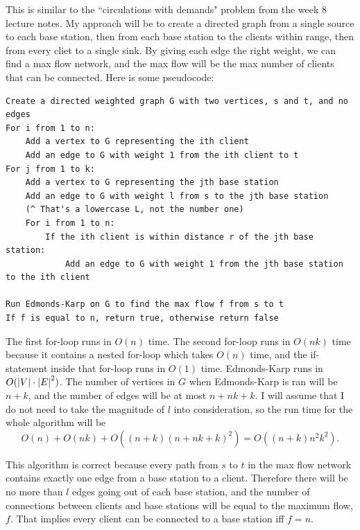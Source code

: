 \documentclass{article}
\begin{document}
\bigskip
\par
\begin{prob}
\end{prob}
This is similar to the ``circulations with demands" problem from the week 8 lecture notes. My approach will be to create a directed graph from a single source to each base station, then from each base station to the clients within range, then from every cliet to a single sink. By giving each edge the right weight, we can find a max flow network, and the max flow will be the max number of clients that can be connected. Here is some pseudocode:
\begin{lstlisting}[frame=single]
Create a directed weighted graph G with two vertices, s and t, and no edges
For i from 1 to n:
    Add a vertex to G representing the ith client
    Add an edge to G with weight 1 from the ith client to t
For j from 1 to k:
    Add a vertex to G representing the jth base station
    Add an edge to G with weight l from s to the jth base station
    (^ That's a lowercase L, not the number one)
    For i from 1 to n:
        If the ith client is within distance r of the jth base station:
            Add an edge to G with weight 1 from the jth base station to the ith client

Run Edmonds-Karp on G to find the max flow f from s to t
If f is equal to n, return true, otherwise return false
\end{lstlisting}
The first for-loop runs in $O(n)$ time. The second for-loop runs in $O(nk)$ time because it contains a nested for-loop which takes $O(n)$ time, and the if-statement inside that for-loop runs in $O(1)$ time. Edmonds-Karp runs in $O(\left\lvert V \right\rvert \cdot \left\lvert E \right\rvert^2)$. The number of vertices in $G$ when Edmonds-Karp is ran will be $n+k$, and the number of edges will be at most $n+nk+k$. I will assume that I do not need to take the magnitude of $l$ into consideration, so the run time for the whole algorithm will be
\[ O(n)+O(nk)+O((n+k)(n+nk+k)^2) = O((n+k)n^2k^2). \]
\par
This algorithm is correct because every path from $s$ to $t$ in the max flow network contains exactly one edge from a base station to a client. Therefore there will be no more than $l$ edges going out of each base station, and the number of connections between clients and base stations will be equal to the maximum flow, $f$. That implies every client can be connected to a base station iff $f=n$.
\end{document}
